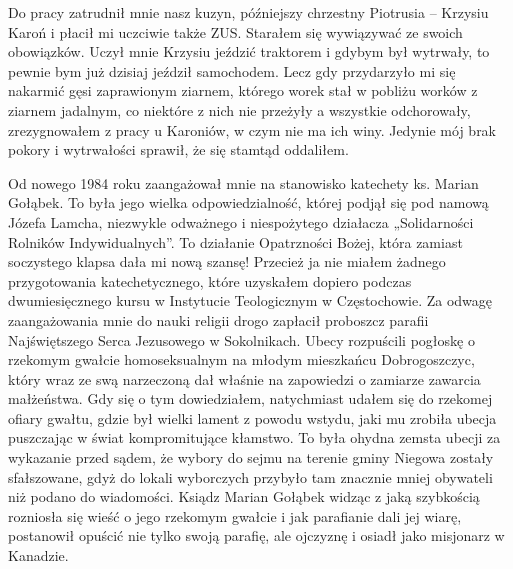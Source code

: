 Do pracy zatrudnił mnie nasz kuzyn, późniejszy chrzestny Piotrusia – Krzysiu Karoń i płacił mi uczciwie także ZUS. Starałem się wywiązywać ze swoich obowiązków. Uczył mnie Krzysiu jeździć traktorem i gdybym był wytrwały, to pewnie bym już dzisiaj jeździł samochodem. Lecz gdy przydarzyło mi się nakarmić gęsi zaprawionym ziarnem, którego worek stał w pobliżu worków z ziarnem jadalnym, co niektóre z nich nie przeżyły a wszystkie odchorowały, zrezygnowałem z pracy u Karoniów, w czym nie ma ich winy. Jedynie mój brak pokory i wytrwałości sprawił, że się stamtąd oddaliłem. 

Od nowego 1984 roku zaangażował mnie na stanowisko katechety ks. Marian Gołąbek. To była jego wielka odpowiedzialność, której podjął się pod namową Józefa Lamcha, niezwykle odważnego i niespożytego działacza „Solidarności Rolników Indywidualnych”. To działanie Opatrzności Bożej, która zamiast soczystego klapsa dała mi nową szansę! Przecież ja nie miałem żadnego przygotowania katechetycznego, które uzyskałem dopiero podczas dwumiesięcznego kursu w Instytucie Teologicznym w Częstochowie. Za odwagę zaangażowania mnie do nauki religii drogo zapłacił proboszcz parafii Najświętszego Serca Jezusowego w Sokolnikach. Ubecy rozpuścili pogłoskę o rzekomym gwałcie homoseksualnym na młodym mieszkańcu Dobrogoszczyc, który wraz ze swą narzeczoną dał właśnie na zapowiedzi o zamiarze zawarcia małżeństwa. Gdy się o tym dowiedziałem, natychmiast udałem się do rzekomej ofiary gwałtu, gdzie był wielki lament z powodu wstydu, jaki mu zrobiła ubecja puszczając w świat kompromitujące kłamstwo. To była ohydna zemsta ubecji za wykazanie przed sądem, że wybory do sejmu na terenie gminy Niegowa zostały sfałszowane, gdyż do lokali wyborczych przybyło tam znacznie mniej obywateli niż podano do wiadomości. Ksiądz Marian Gołąbek widząc z jaką szybkością rozniosła się wieść o jego rzekomym gwałcie i jak parafianie dali jej wiarę, postanowił opuścić nie tylko swoją parafię, ale ojczyznę i osiadł jako misjonarz w Kanadzie.

